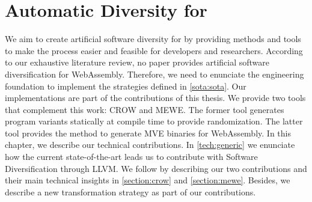 \chapter{Automatic Diversity for \wasm}
\label{chapter:technical}


We aim to create artificial software diversity for \wasm by providing methods and tools to make the process easier and feasible for developers and researchers. According to our exhaustive literature review, no paper provides artificial software diversification for WebAssembly. Therefore, we need to enunciate the engineering foundation to implement the strategies defined in \autoref{sota:sota}. Our implementations are part of the contributions of this thesis. We provide two tools that complement this work: CROW and MEWE. The former tool generates \wasm program variants statically at compile time to provide randomization. The latter tool provides the method to generate MVE binaries for WebAssembly.
In this chapter, we describe our technical contributions. In \autoref{tech:generic} we enunciate how the current state-of-the-art leads us to contribute with Software Diversification through LLVM. We follow by describing our two contributions and their main technical insights in \autoref{section:crow} and \autoref{section:mewe}. Besides, we describe a new transformation strategy as part of our contributions. 


















